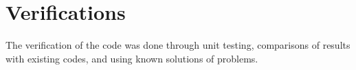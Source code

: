 \section{Verifications}
The verification of the code was done through unit testing, comparisons of
results with existing codes, and using known solutions of problems.
